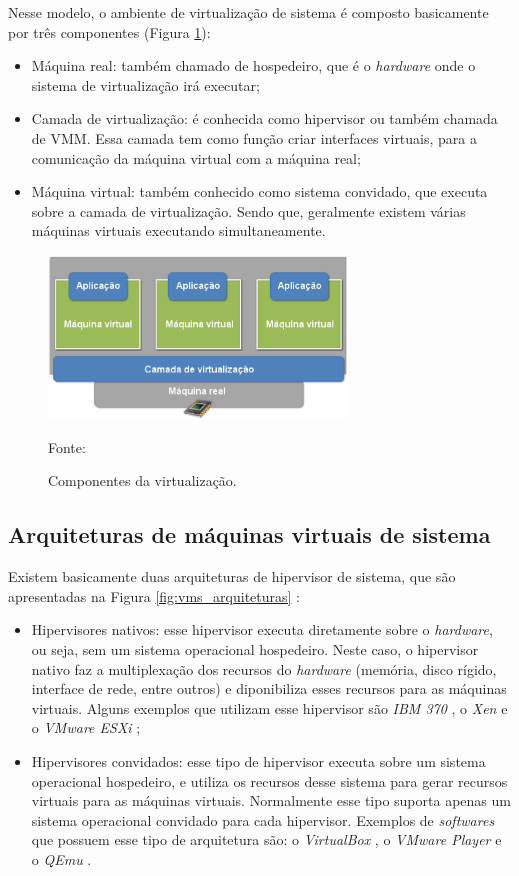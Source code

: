 Nesse modelo, o ambiente de virtualização de sistema é composto basicamente por três componentes (Figura \ref{fig:virtcomponentes}):
\begin{itemize}
 \item Máquina real: também chamado de hospedeiro, que é o \textit{hardware} onde o sistema de virtualização irá executar;
 \item Camada de virtualização: é conhecida como hipervisor ou também chamada de \ac{VMM}. Essa camada tem como função criar interfaces 
 virtuais, para a comunicação da máquina virtual com a máquina real;
 \item Máquina virtual: também conhecido como sistema convidado, que executa sobre a camada de virtualização. Sendo que, geralmente
 existem várias máquinas virtuais executando simultaneamente.
\end{itemize}

\begin{figure}[virtcomponentes]
 \centering
 \includegraphics[width=300px]{img/virtcomponentes.eps}
 \caption{Componentes da virtualização.}
 \label{fig:virtcomponentes}
 Fonte: \citet{andrade2011}
\end{figure}

\subsection{Arquiteturas de máquinas virtuais de sistema}
\label{section:virtarquit}

Existem basicamente duas arquiteturas de hipervisor de sistema, que são apresentadas na Figura \ref{fig:vms_arquiteturas} \cite{maziero2013}:
\begin{itemize}
 \item Hipervisores nativos: esse hipervisor executa diretamente sobre o \textit{hardware}, ou seja, sem um sistema operacional
 hospedeiro. Neste caso, o hipervisor nativo faz a multiplexação dos recursos do \textit{hardware} (memória, disco rígido, interface de rede, 
 entre outros) e diponibiliza esses recursos para as máquinas virtuais. Alguns exemplos que utilizam esse hipervisor são 
 \textit{IBM 370} \cite{ibm370}, o \textit{Xen} \cite{xen} e o \textit{VMware ESXi} \cite{vmwareesxi};
 \item Hipervisores convidados: esse tipo de hipervisor executa sobre um sistema operacional hospedeiro, e utiliza os recursos 
 desse sistema para gerar recursos virtuais para as máquinas virtuais. Normalmente esse tipo suporta apenas um sistema 
 operacional convidado para cada hipervisor. Exemplos de \textit{softwares} que possuem esse tipo de arquitetura são: o 
 \textit{VirtualBox} \cite{virtualbox}, o \textit{VMware Player} \cite{vmwareplayer} e o \textit{QEmu} \cite{qemu}.
\end{itemize}

